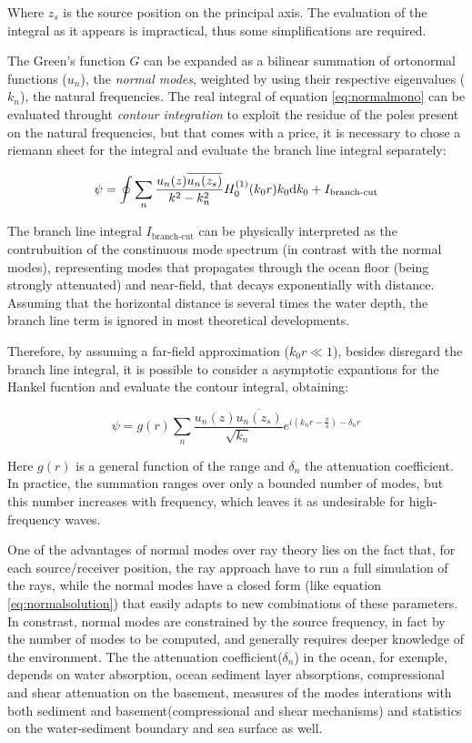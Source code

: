Where $z_s$ is the source position on the principal axis. The evaluation of the
integral as it appears is impractical, thus some simplifications are required.

The Green's function $G$ can be expanded as a bilinear summation of ortonormal
functions ($u_ n$), the \textit{normal modes}\cite{baker2003green}, weighted by
using their respective eigenvalues ($k_n$), the natural frequencies. The real
integral of equation \ref{eq:normalmono} can be evaluated throught \textit{contour
integration} to exploit the residue of the poles present on the natural
frequencies, but that comes with a price, it is necessary to chose a riemann
sheet for the integral and evaluate the branch line integral
separately\cite{jensen2011computational,worzel1948propagation}:

\begin{equation}
\psi = \oint \sum_n{\frac{u_n(z)\overline{u_n(z_s)}}{k^2 -
k_n^2}H_0^{(1)}(k_0r)k_0\mathrm{d} k_0} + I_{\text{branch-cut}}
\end{equation}

The branch line integral $I_{\text{branch-cut}}$ can be physically interpreted
as the contrubuition of the constinuous mode spectrum (in contrast with the
normal modes), representing modes that propagates through the ocean floor
(being strongly attenuated) and near-field, that decays exponentially with
distance. Assuming that the horizontal distance is several times the water
depth, the branch line term is ignored in most theoretical developments.

Therefore, by assuming a far-field approximation ($k_0r \ll 1$), besides
disregard the branch line integral, it is possible to consider a asymptotic expantions for the
Hankel fucntion and evaluate the contour integral, obtaining\cite{Etter2013}:

\begin{equation}
\label{eq:normalsolution}
\psi =
g(r)\sum_n{\frac{u_n(z)\overline{u_n(z_s)}}{\sqrt{k_n}}e^{i(k_nr-\tfrac{\pi}{4})-\delta_nr}}
\end{equation}

Here $g(r)$ is a general function of the range and $\delta_n$ the attenuation
coefficient. In practice, the summation ranges over only a bounded number of
modes, but this number increases with frequency, which leaves it as undesirable
for high-frequency waves. 

One of the advantages of normal modes over ray theory lies on the fact that, for
each source/receiver position, the ray approach have to run a full simulation of
the rays, while the normal modes have a closed form (like equation
\ref{eq:normalsolution}) that easily adapts to new combinations of these
parameters. In constrast, normal modes are constrained by the source frequency,
in fact by the number of modes to be computed, and generally requires deeper
knowledge of the environment. The the attenuation
coefficient($\delta_n$) in the ocean, for exemple, depends on water absorption,
ocean sediment layer absorptions, compressional and shear attenuation on the
basement, measures of the modes interations with both sediment and
basement(compressional and shear mechanisms) and statistics on the
water-sediment boundary and sea surface as well.

